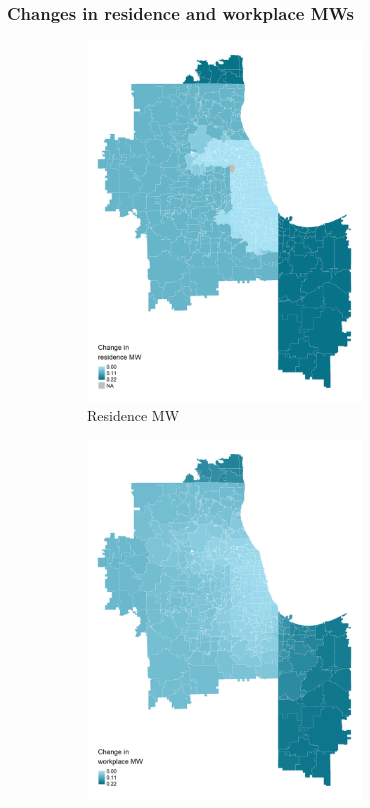 \documentclass[aspectratio=169, t]{beamer}
\begin{document}
\begin{frame}
    \frametitle{Changes in residence and workplace MWs}

    \vspace{-2mm}
    
    \begin{figure}
        \begin{subfigure}{0.5\textwidth}
            \includegraphics[width = 0.8\textwidth]{counterfactuals/output/chicago_d_mw_res.png}
            \caption*{Residence MW}
        \end{subfigure}%
        \begin{subfigure}{0.5\textwidth}
            \includegraphics[width = 0.8\textwidth]{counterfactuals/output/chicago_d_mw_wkp.png}

\end{subfigure}
\end{figure}
\end{frame}
\end{document}

